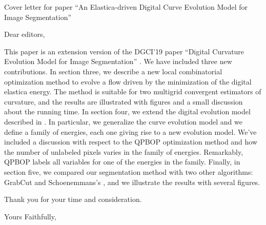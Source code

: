 \documentclass{letter}
\begin{document}
\begin{letter}{Cover letter for paper ``An Elastica-driven Digital Curve Evolution Model for Image Segmentation''}
\opening{Dear editors,}

This paper is an extension version of the DGCI'19 paper ``Digital Curvature Evolution Model for Image Segmentation'' \cite{antunes19}. We have included three new contributions. In section three, we describe a new local combinatorial optimization method to evolve a flow driven by the minimization of the digital elastica energy. The method is suitable for two multigrid convergent estimators of curvature, and the results are illustrated with figures and a small discussion about the running time. In section four, we extend the digital evolution model described in \cite{antunes19}. In particular, we generalize the curve evolution model  and we define a family of energies, each one giving rise to a new evolution model. We've included a discussion with respect to the QPBOP optimization method and how the number of unlabeled pixels varies in the family of energies. Remarkably, QPBOP labels all variables for one of the energies in the family. Finally, in section five, we compared our segmentation method with two other algorithms: GrabCut \cite{rother04grabcut} and Schoenemmans's \cite{schoenemann09linear}, and we illustrate the results with several figures. 

Thank you for your time and consideration.

\closing{Yours Faithfully,}




\end{letter}


\end{document}
